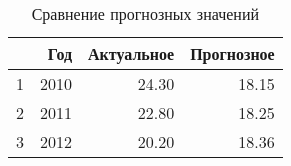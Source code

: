 \begin{table}[H]
\centering
\begin{tabular}{rrrr}
  \hline
 & Год & Актуальное & Прогнозное \\ 
  \hline
1 & 2010 & 24.30 & 18.15 \\ 
  2 & 2011 & 22.80 & 18.25 \\ 
  3 & 2012 & 20.20 & 18.36 \\ 
   \hline
\end{tabular}
\caption{Сравнение прогнозных значений} 
\label{table:prediction_trend}
\end{table}
